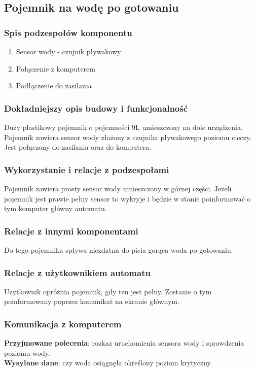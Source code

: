 \documentclass[12pt,a4paper,notitlepage]{article}
\begin{document}
\subsection{Pojemnik na wodę po gotowaniu}
\subsubsection{Spis podzespołów komponentu}
\begin{enumerate}
  \item Sensor wody - czujnik pływakowy
  \item Połączenie z komputerem
  \item Podłączenie do zasilania
\end{enumerate}

\subsubsection{Dokładniejszy opis budowy i funkcjonalność}
Duży plastikowy pojemnik o pojemności 9L umieszczony na dole urządzenia. Pojemnik zawiera sensor wody złożony z czujnika pływakowego poziomu cieczy. Jest połączony do zasilania oraz do komputera.
 
\subsubsection{Wykorzystanie i relacje z podzespołami}
Pojemnik zawiera prosty sensor wody umieszczony w górnej części. Jeżeli pojemnik jest prawie pełny sensor to wykryje i będzie w stanie poinformować o tym komputer główny automatu.

\subsubsection{Relacje z innymi komponentami}
Do tego pojemnika spływa niezdatna do picia gorąca woda po gotowaniu.

\subsubsection{Relacje z użytkownikiem automatu}
Użytkownik opróżnia pojemnik, gdy ten jest pełny. Zostanie o tym poinformowany poprzez komunikat na ekranie głównym.

\subsubsection{Komunikacja z komputerem}
\textbf{Przyjmowane polecenia}: rozkaz uruchomienia sensora wody i sprawdzenia poziomu wody.\\
\textbf{Wysyłane dane}: czy woda osiągnęła określony poziom krytyczny.
\end{document}
